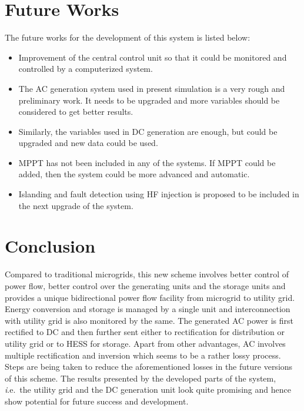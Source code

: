\documentclass[journal,twoside]{IEEEtran}
\begin{document}
\section{Future Works}
The future works for the development of this system is
listed below:
\begin{itemize}
\item Improvement of the central control unit so that it
could be monitored and controlled by a
computerized system.
\item The AC generation system used in present
simulation is a very rough and preliminary work.
It needs to be upgraded and more variables should
be considered to get better results.
\item Similarly, the variables used in DC generation are
enough, but could be upgraded and new data could
be used.
\item MPPT has not been included in any of the systems.
If MPPT could be added, then the system could be
more advanced and automatic.
\item Islanding and fault detection using HF injection is
proposed to be included in the next upgrade of the
system.
\end{itemize}

\section{Conclusion}
Compared to traditional microgrids, this new
scheme involves better control of power flow, better
control over the generating units and the storage units
and provides a unique bidirectional power flow facility
from microgrid to utility grid.
Energy conversion and storage is managed by
a single unit and interconnection with utility grid is
also monitored by the same.
The generated AC power is first rectified to
DC and then further sent either to rectification for
distribution or utility grid or to HESS for storage. Apart from other advantages, AC
involves multiple rectification and inversion which
seems to be a rather lossy process. Steps are being
taken to reduce the aforementioned losses in the future
versions of this scheme.
The results presented by the developed parts
of the system, \textit i.e.\ the utility grid and the DC
generation unit look quite promising and hence show
potential for future success and development.
\end{document}
